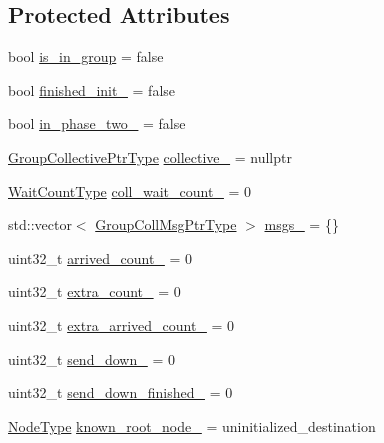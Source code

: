 \subsection*{Protected Attributes}
\begin{DoxyCompactItemize}
\item 
bool \hyperlink{structvt_1_1group_1_1_info_coll_a0a6bdffd7fc61b4e3817673d0a4b9ea9}{is\+\_\+in\+\_\+group} = false
\item 
bool \hyperlink{structvt_1_1group_1_1_info_coll_a46f40eb8a2394642b362b08024454af0}{finished\+\_\+init\+\_\+} = false
\item 
bool \hyperlink{structvt_1_1group_1_1_info_coll_ae96c291d014d6b27cc385d66e50a406f}{in\+\_\+phase\+\_\+two\+\_\+} = false
\item 
\hyperlink{structvt_1_1group_1_1_info_coll_a96f3e779eb522034ee3db6c93b3f4c6b}{Group\+Collective\+Ptr\+Type} \hyperlink{structvt_1_1group_1_1_info_coll_a36715c6570b0b82320b42f43932881d3}{collective\+\_\+} = nullptr
\item 
\hyperlink{structvt_1_1group_1_1_info_base_a0924de8df3a2ec72ebdd499ad8a28abf}{Wait\+Count\+Type} \hyperlink{structvt_1_1group_1_1_info_coll_a960af04b6804a2000017f9358b689c02}{coll\+\_\+wait\+\_\+count\+\_\+} = 0
\item 
std\+::vector$<$ \hyperlink{structvt_1_1group_1_1_info_coll_a1fcdc451e1e99aedebf302b234c529a6}{Group\+Coll\+Msg\+Ptr\+Type} $>$ \hyperlink{structvt_1_1group_1_1_info_coll_a30fc9a06654d5213b3355834938d6034}{msgs\+\_\+} = \{\}
\item 
uint32\+\_\+t \hyperlink{structvt_1_1group_1_1_info_coll_aceffca2aa6280f325f394e1e64ebc130}{arrived\+\_\+count\+\_\+} = 0
\item 
uint32\+\_\+t \hyperlink{structvt_1_1group_1_1_info_coll_a5996d9af993d2ef3a75d08adf6afa43c}{extra\+\_\+count\+\_\+} = 0
\item 
uint32\+\_\+t \hyperlink{structvt_1_1group_1_1_info_coll_ae15aee7207e11a978f327afa1024f7c8}{extra\+\_\+arrived\+\_\+count\+\_\+} = 0
\item 
uint32\+\_\+t \hyperlink{structvt_1_1group_1_1_info_coll_ad855e1491e7893d3be38084427736895}{send\+\_\+down\+\_\+} = 0
\item 
uint32\+\_\+t \hyperlink{structvt_1_1group_1_1_info_coll_ab550c62eb0f12b06332058ef0ac6b2fd}{send\+\_\+down\+\_\+finished\+\_\+} = 0
\item 
\hyperlink{namespacevt_a866da9d0efc19c0a1ce79e9e492f47e2}{Node\+Type} \hyperlink{structvt_1_1group_1_1_info_coll_a89e612584c480324a5d11c2c5d672c81}{known\+\_\+root\+\_\+node\+\_\+} = uninitialized\+\_\+destination

\end{DoxyCompactItemize}
